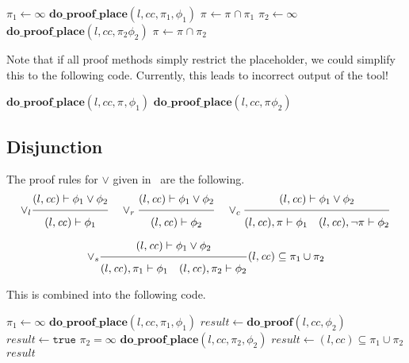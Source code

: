 \documentclass{article}
\newcommand{\proofrule}[3][]{#1 \frac{\raisebox{.7ex}{\normalsize{$#2$}}}
  {\raisebox{-1.0ex}{\normalsize{$#3$}}}}
\newcommand{\placeholder}[1][]{\pi_{#1}}
\newcommand{\loc}{l}
\newcommand{\region}{\mathit{cc}}
\newcommand{\var}[1]{\ensuremath{\mathit{#1}}}
\newcommand{\method}[1]{\ensuremath{\mathbf{#1}}}
\newcommand{\true}{\texttt{true}}
\begin{document}
\begin{algorithm}[H]
\caption{$\method{do\_proof\_place\_and}(\loc, \region, \placeholder, \phi_1 \land \phi_2)$}
\begin{algorithmic}
\STATE $\placeholder[1] \gets \infty$
\STATE $\method{do\_proof\_place}(\loc, \region, \placeholder[1], \phi_1)$
\STATE $\placeholder \gets \placeholder \cap \placeholder[1]$
\IF{$\placeholder = \emptyset$}
  \STATE $\placeholder[2] \gets \infty$
  \STATE $\method{do\_proof\_place}(\loc, \region, \placeholder[2] \phi_2)$
  \STATE $\placeholder \gets \placeholder \cap \placeholder[2]$
\ENDIF
\end{algorithmic}
\end{algorithm}
Note that if all proof methods simply restrict the placeholder, we could simplify this to the following code.
Currently, this leads to incorrect output of the tool!
\begin{algorithm}[H]
\caption{$\method{do\_proof\_place\_and}(\loc, \region, \placeholder, \phi_1 \land \phi_2)$}
\begin{algorithmic}
\STATE $\method{do\_proof\_place}(\loc, \region, \placeholder, \phi_1)$
\IF{$\placeholder = \emptyset$}
  \STATE $\method{do\_proof\_place}(\loc, \region, \placeholder \phi_2)$
\ENDIF
\end{algorithmic}
\end{algorithm}

\subsection{Disjunction}
The proof rules for $\lor$ given in~\cite{FC:14} are the following.
\[
\proofrule[\lor_l]
{(\loc, \region) \vdash \phi_1 \lor \phi_2}
{(\loc, \region) \vdash \phi_1}
%
\quad
\proofrule[\lor_r]
{(\loc, \region) \vdash \phi_1 \lor \phi_2}
{(\loc, \region) \vdash \phi_2}
\quad
\proofrule[\lor_c]
{(\loc, \region) \vdash \phi_1 \lor \phi_2}
{(\loc, \region), \placeholder \vdash \phi_1
\quad
(\loc, \region), \lnot \placeholder \vdash \phi_2
}
\]

\[
\proofrule[\lor_s]
{(\loc, \region) \vdash \phi_1 \lor \phi_2}
{(\loc, \region), \placeholder[1] \vdash \phi_1
\quad (\loc, \region), \placeholder[2] \vdash \phi_2}
(\loc, \region) \subseteq \placeholder[1] \cup \placeholder[2]
\]

This is combined into the following code.
\begin{algorithm}[H]
\caption{$\method{do\_proof\_or}(\loc, \region, \phi_1 \lor \phi_2)$}
\begin{algorithmic}
\STATE $\placeholder[1] \gets \infty$
\STATE $\method{do\_proof\_place}(\loc, \region, \placeholder[1], \phi_1)$
\IF[Rule $\lor_r$]{$\placeholder[1] = \emptyset$}
  \STATE $\var{result} \gets \method{do\_proof}(\loc, \region, \phi_2)$
\ELSIF[Rule $\lor_l$]{$(\loc, \region) \subseteq \placeholder[1]$}
   \STATE $\var{result} \gets \true$
  \STATE $\placeholder[2] = \infty$
  \STATE $\method{do\_proof\_place}(\loc, \region, \placeholder[2], \phi_2)$
  \STATE $\var{result} \gets (l,cc) \subseteq \placeholder[1] \cup \placeholder[2]$
\ENDIF
\RETURN \var{result}
\end{algorithmic}
\end{algorithm}
\end{document}

